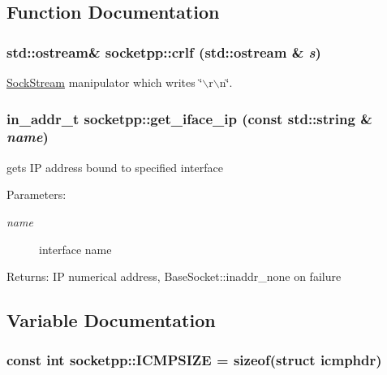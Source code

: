 \subsection{Function Documentation}
\hypertarget{namespacesocketpp_0c17a8fc8340bca21992d92cf17f8df5}{
\subsubsection[{crlf}]{\setlength{\rightskip}{0pt plus 5cm}std::ostream\& socketpp::crlf (std::ostream \& {\em s})}}
\label{namespacesocketpp_0c17a8fc8340bca21992d92cf17f8df5}


\hyperlink{classsocketpp_1_1SockStream}{SockStream} manipulator which writes \char`\"{}$\backslash$r$\backslash$n\char`\"{}. 

\hypertarget{namespacesocketpp_e04237b3f443ecc14051f52a59450692}{
\subsubsection[{get\_\-iface\_\-ip}]{\setlength{\rightskip}{0pt plus 5cm}in\_\-addr\_\-t socketpp::get\_\-iface\_\-ip (const std::string \& {\em name})}}
\label{namespacesocketpp_e04237b3f443ecc14051f52a59450692}


gets IP address bound to specified interface 

\begin{Desc}
\item[Parameters:]
\begin{description}
\item[{\em name}]interface name \end{description}
\end{Desc}
\begin{Desc}
\item[Returns:]IP numerical address, BaseSocket::inaddr\_\-none on failure \end{Desc}


\subsection{Variable Documentation}
\hypertarget{namespacesocketpp_fa361b148e87f58b86a95abc48e281fb}{
\subsubsection[{ICMPSIZE}]{\setlength{\rightskip}{0pt plus 5cm}const int {\bf socketpp::ICMPSIZE} = sizeof(struct {\bf icmphdr})}}
\label{namespacesocketpp_fa361b148e87f58b86a95abc48e281fb}


